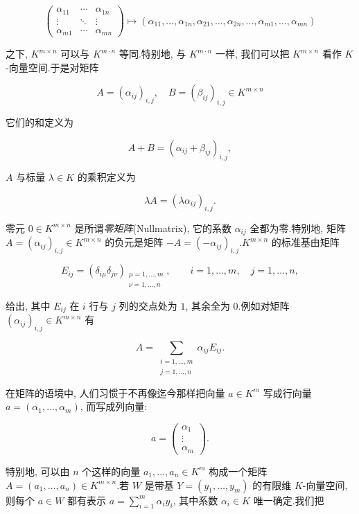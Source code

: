 \[
\begin{pmatrix}
\alpha_{11} & \cdots & \alpha_{1n} \\
\vdots & \ddots & \vdots \\
\alpha_{m1} & \cdots & \alpha_{mn}
\end{pmatrix}
\longmapsto
(\alpha_{11}, \ldots, \alpha_{1n}, \alpha_{21}, \ldots, \alpha_{2n}, \ldots, \alpha_{m1}, \ldots, \alpha_{mn})
\]

之下, $K^{m \times n}$ 可以与 $K^{m \cdot n}$ 等同.特别地, 与 $K^{m \cdot n}$ 一样, 我们可以把 $K^{m \times n}$ 看作 $K$-向量空间.于是对矩阵

\[
A = (\alpha_{ij})_{i, j}, \quad B = (\beta_{ij})_{i, j} \in K^{m \times n}
\]

它们的和定义为

\[
A + B = (\alpha_{ij} + \beta_{ij})_{i, j},
\]

$A$ 与标量 $\lambda \in K$ 的乘积定义为

\[
\lambda A = (\lambda\alpha_{ij})_{i, j}\text{.}
\]

零元 $0 \in K^{m \times n}$ 是所谓\emph{零矩阵}(\textup{Nullmatrix}), 它的系数 $\alpha_{ij}$ 全都为零.特别地, 矩阵 $A = (\alpha_{ij})_{i, j} \in K^{m \times n}$ 的负元是矩阵 $-A = (-\alpha_{ij})_{i, j}$.$K^{m \times n}$ 的标准基由矩阵

\[
E_{ij} = (\delta_{i\mu}\delta_{j\nu})_{\substack{\mu = 1, \ldots, m\\ \nu = 1, \ldots, n}}, \qquad i = 1, \ldots, m, \quad j = 1, \ldots, n,
\]

给出, 其中 $E_{ij}$ 在 $i$ 行与 $j$ 列的交点处为 $1$, 其余全为 $0$.例如对矩阵 $(\alpha_{ij})_{i, j} \in K^{m \times n}$ 有

\[
A = \sum_{\substack{i = 1, \ldots, m\\ j = 1, \ldots, n}}\alpha_{ij}E_{ij}\text{.}
\]

在矩阵的语境中, 人们习惯于不再像迄今那样把向量 $a \in K^m$ 写成行向量 $a = (\alpha_1, \ldots, \alpha_m)$, 而写成列向量:

\[
a = \begin{pmatrix} \alpha_1 \\ \vdots \\ \alpha_m \end{pmatrix}\text{.}
\]

特别地, 可以由 $n$ 个这样的向量 $a_1, \ldots, a_n \in K^m$ 构成一个矩阵 $A = (a_1, \ldots, a_n) \in K^{m \times n}$.若 $W$ 是带基 $Y = (y_1, \ldots, y_m)$ 的有限维 $K$-向量空间, 则每个 $a \in W$ 都有表示 $a = \sum_{i = 1}^{m}\alpha_i y_i$, 其中系数 $\alpha_i \in K$ 唯一确定.我们把

